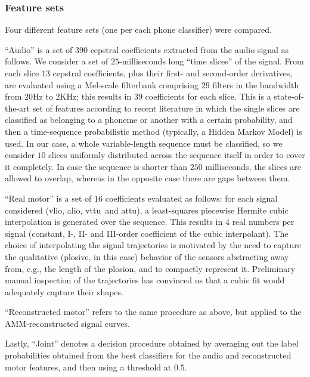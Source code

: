 \documentclass[10pt]{article}
\newcommand{\vlio}{\textsf{vlio}}
\newcommand{\vttu}{\textsf{vttu}}
\newcommand{\alio}{\textsf{alio}}
\newcommand{\attu}{\textsf{attu}}
\begin{document}
\subsubsection*{Feature sets}
Four different feature sets (one per each phone classifier) were compared. 

``Audio'' is a set of $390$ cepstral coefficients extracted from the audio signal
as follows. We consider a set of $25$-milliseconds long ``time slices'' of the signal.
From each slice $13$ cepstral coefficients, plus their first- and second-order derivatives,
are evaluated using a Mel-scale filterbank comprising $29$ filters in the bandwidth from
$20$Hz to $2$KHz; this results in $39$ coefficients for each slice. This is a state-of-the-art
set of features according to recent literature \cite{bourl,pinto:icassp-phnrecog:2008}
in which the single slices are classified as belonging to a phoneme or another with a certain
probability, and then a time-sequence probabilistic method (typically, a Hidden Markov Model)
is used. In our case, a whole variable-length sequence must be classified, so we consider
$10$ slices uniformly distributed across the sequence itself in order to cover it completely.
In case the sequence is shorter than $250$ milliseconds, the slices are allowed to overlap,
whereas in the opposite case there are gaps between them.

``Real motor'' is a set of $16$ coefficients evaluated as follows: for each
signal considered (\vlio, \alio, \vttu\ and \attu), a least-squares piecewise
Hermite cubic interpolation is generated over the sequence. This results in $4$ real
numbers per signal (constant, I-, II- and III-order coefficient of the cubic
interpolant). The choice of interpolating the signal trajectories is motivated by
the need to capture the qualitative (plosive, in this case) behavior of the sensors
abstracting away from, e.g., the length of the plosion, and to compactly represent it.
Preliminary manual inspection of the trajectories has convinced us that a cubic fit
would adequately capture their shapes.

``Reconstructed motor'' refers to the same procedure as above, but applied
to the AMM-reconstructed signal curves.

Lastly, ``Joint'' denotes a decision procedure obtained by averaging out the
label probabilities obtained from the best classifiers for the audio and
reconstructed motor features, and then using a threshold at $0.5$.
\end{document}
